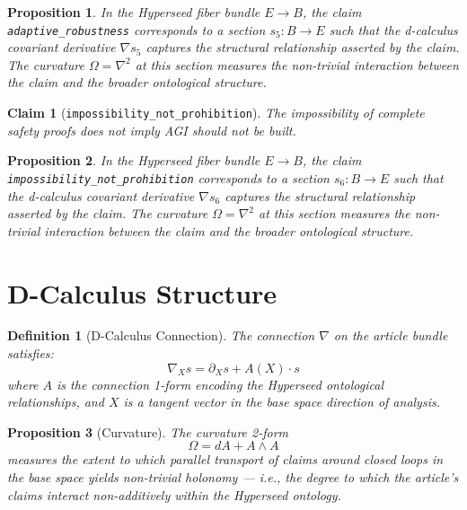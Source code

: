 \documentclass{article}
\newtheorem{claim}{Claim}
\newtheorem{definition}{Definition}
\newtheorem{proposition}{Proposition}
\begin{document}
\begin{proposition}
In the Hyperseed fiber bundle $E \to B$, the claim \texttt{adaptive_robustness} corresponds to a section $s_5: B \to E$ such that the d-calculus covariant derivative $\nabla s_5$ captures the structural relationship asserted by the claim. The curvature $\Omega = \nabla^2$ at this section measures the non-trivial interaction between the claim and the broader ontological structure.
\end{proposition}

\begin{claim}[\texttt{impossibility_not_prohibition}]
The impossibility of complete safety proofs does not imply AGI should not be built.
\end{claim}

\begin{proposition}
In the Hyperseed fiber bundle $E \to B$, the claim \texttt{impossibility_not_prohibition} corresponds to a section $s_6: B \to E$ such that the d-calculus covariant derivative $\nabla s_6$ captures the structural relationship asserted by the claim. The curvature $\Omega = \nabla^2$ at this section measures the non-trivial interaction between the claim and the broader ontological structure.
\end{proposition}

\section{D-Calculus Structure}

\begin{definition}[D-Calculus Connection]
The connection $\nabla$ on the article bundle satisfies:
\begin{equation}
  \nabla_X s = \partial_X s + A(X) \cdot s
\end{equation}
where $A$ is the connection 1-form encoding the Hyperseed ontological relationships, and $X$ is a tangent vector in the base space direction of analysis.
\end{definition}

\begin{proposition}[Curvature]
The curvature 2-form
\begin{equation}
  \Omega = dA + A \wedge A
\end{equation}
measures the extent to which parallel transport of claims around closed loops in the base space yields non-trivial holonomy --- i.e., the degree to which the article's claims interact non-additively within the Hyperseed ontology.
\end{proposition}
\end{document}
